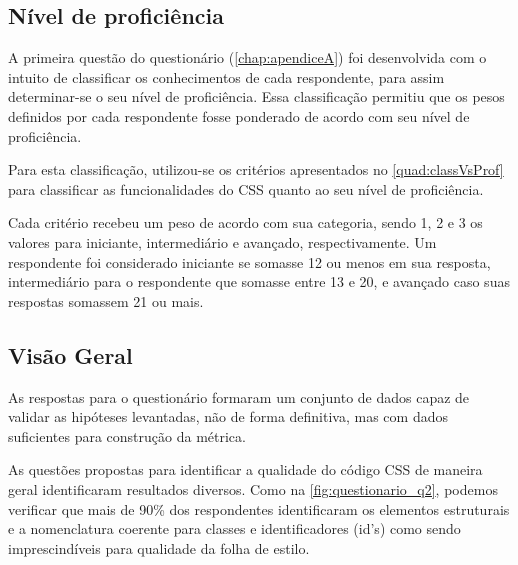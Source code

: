 \subsection{Nível de proficiência}

A primeira questão do questionário (\autoref{chap:apendiceA}) foi desenvolvida com o intuito de classificar os conhecimentos de cada respondente, para assim determinar-se o seu nível de proficiência. Essa classificação permitiu que os pesos definidos por cada respondente fosse ponderado de acordo com seu nível de proficiência.

Para esta classificação, utilizou-se os critérios apresentados no \autoref{quad:classVsProf} para classificar as funcionalidades do CSS quanto ao seu nível de proficiência.



Cada critério recebeu um peso de acordo com sua categoria, sendo 1, 2 e 3 os valores para iniciante, intermediário e avançado, respectivamente. Um respondente foi considerado iniciante se somasse 12 ou menos em sua resposta, intermediário para o respondente que somasse entre 13 e 20, e avançado caso suas respostas somassem 21 ou mais. 

\subsection{Visão Geral}

As respostas para o questionário formaram um conjunto de dados capaz de validar as hipóteses levantadas, não de forma definitiva, mas com dados suficientes para construção da métrica.

As questões propostas para identificar a qualidade do código CSS de maneira geral identificaram resultados diversos. Como na \autoref{fig:questionario_q2}, podemos verificar que mais de 90\% dos respondentes identificaram os elementos estruturais e a nomenclatura coerente para classes e identificadores (id's) como sendo imprescindíveis para qualidade da folha de estilo.

